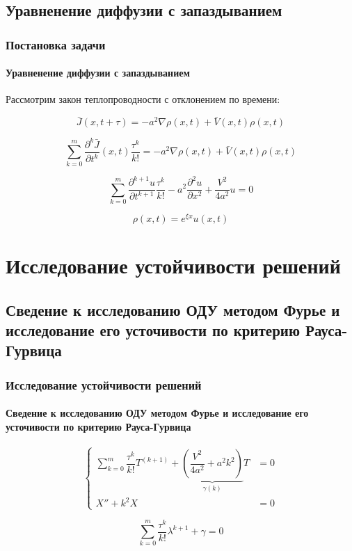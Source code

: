 \documentclass{beamer}
\numberwithin{equation}{section}
\begin{document}
    \subsection{Уравненение диффузии с запаздыванием}
    \begin{frame}
        \frametitle{Постановка задачи}
        \framesubtitle{Уравненение диффузии с запаздыванием}

        Рассмотрим закон теплопроводности с отклонением по времени:

        \begin{equation}
            \bar{J}(x,t+\tau) = -a^2 \nabla \rho(x,t) + \bar{V}(x,t) \rho(x,t)
        \end{equation}

        \begin{equation}
            \sum\limits_{k=0}^{m} \dfrac{\partial^k \bar{J}}{\partial t^k}(x,t) \dfrac{\tau^k}{k!} = -a^2 \nabla \rho(x,t) + \bar{V}(x,t) \rho(x,t)
        \end{equation}

        \begin{equation}
            \sum\limits_{k=0}^{m} \dfrac{\partial^{k+1} u}{\partial t^{k+1}} \dfrac{\tau^k}{k!} - a^2 \dfrac{\partial^2 u}{\partial x^2} + \dfrac{V^2}{4a^2} u = 0
        \end{equation}

        \begin{equation}
            \rho(x,t) = e^{\xi x} u(x,t)
        \end{equation}

    \end{frame}

    \section{Исследование устойчивости решений}
    \subsection{Сведение к исследованию ОДУ методом Фурье и исследование его усточивости по критерию Рауса-Гурвица}
    \begin{frame}
        \frametitle{Исследование устойчивости решений}
        \framesubtitle{Сведение к исследованию ОДУ методом Фурье и исследование его усточивости по критерию Рауса-Гурвица}

        \begin{equation}
            \left\{
            \begin{aligned}
                \sum\limits_{k=0}^{m} \dfrac{\tau^k}{k!} T^{(k+1)} + \underbrace{ \left( \dfrac{V^2}{4a^2} + a^2 k^2 \right)}_{\gamma(k)} T & = 0\\
                X'' + k^2 X & = 0
            \end{aligned}
            \right.
        \end{equation}

        \begin{equation}
            \sum\limits_{k=0}^{m} \dfrac{\tau^k}{k!} \lambda^{k+1} + {\gamma} = 0
        \end{equation}

    \end{frame}
\end{document}
